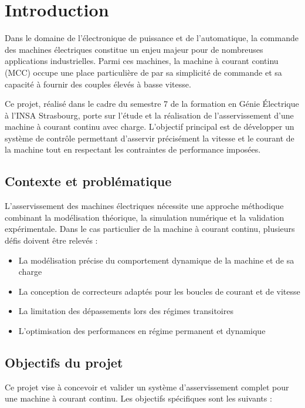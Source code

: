 \chapter*{Introduction}

Dans le domaine de l'électronique de puissance et de l'automatique, la commande des machines électriques constitue un enjeu majeur pour de nombreuses applications industrielles. Parmi ces machines, la machine à courant continu (MCC) occupe une place particulière de par sa simplicité de commande et sa capacité à fournir des couples élevés à basse vitesse.

Ce projet, réalisé dans le cadre du semestre 7 de la formation en Génie Électrique à l'INSA Strasbourg, porte sur l'étude et la réalisation de l'asservissement d'une machine à courant continu avec charge. L'objectif principal est de développer un système de contrôle permettant d'asservir précisément la vitesse et le courant de la machine tout en respectant les contraintes de performance imposées.

\section*{Contexte et problématique}

L'asservissement des machines électriques nécessite une approche méthodique combinant la modélisation théorique, la simulation numérique et la validation expérimentale. Dans le cas particulier de la machine à courant continu, plusieurs défis doivent être relevés :

\begin{itemize}
    \item La modélisation précise du comportement dynamique de la machine et de sa charge
    \item La conception de correcteurs adaptés pour les boucles de courant et de vitesse
    \item La limitation des dépassements lors des régimes transitoires
    \item L'optimisation des performances en régime permanent et dynamique
\end{itemize}

\section*{Objectifs du projet}

Ce projet vise à concevoir et valider un système d'asservissement complet pour une machine à courant continu. Les objectifs spécifiques sont les suivants :

